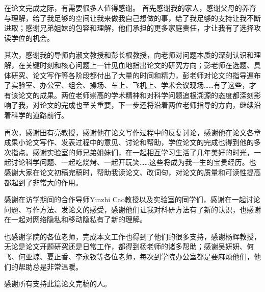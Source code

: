 \begin{thanks}
	
	在论文完成之际，有需要很多人值得感谢。
	首先感谢我的家人，感谢父母的养育与理解，给了我足够的空间让我来做我自己想做的事，给了我足够的支持让我不断进取；感谢兄弟姐妹的包容和理解，他们承担的更多家庭责任，才让我有了选择攻读学位的机会。
	
	其次，感谢我的导师向淑文教授和彭长根教授，向老师对问题本质的深刻认识和理解，在关键时刻和核心问题上一针见血地指出论文的研究方向；彭老师在选题、具体研究、论文写作等各阶段都付出了大量的时间和精力，彭老师对论文的指导遍布了实验室、办公室、组会、操场、车上、飞机上、学术会议现场……有了这些，才有该论文的成果。两位老师崇高的学术精神和对科学问题追根溯源的态度都深刻影响了我，对论文的完成也至关重要，下一步还将沿着两位老师指导的方向，继续沿着科学的道路前行。
	
	再次，感谢田有亮教授，感谢他在论文写作过程中的反复讨论，感谢他在论文各章成果小论文写作、发表过程中的意见、讨论和帮助，学位论文的完成也得到他的多次指点。感谢实验室的师兄弟姐妹们，在一起相互学习生活了几年美好的时光，一起讨论科学问题、一起吃烧烤、一起开玩笑……这些将成为我一生的宝贵经历。也感谢大家在论文初稿完稿时，帮助我读论文、改词句，对论文的质量和可读性提高都起到了非常大的作用。
	
	感谢在访学期间的合作导师Yinzhi Cao教授以及实验室的同学们，感谢在一起讨论问题、写作方法、发论文的感受，感谢他们让我对科研方法有了新的认识，也感谢在一起对网络隐私和移动隐私有了新的理解。
	
	也感谢学院的各位老师，完成本文工作也得到了他们的很多支持，感谢杨辉教授，无论是论文开题研究还是日常工作，都得到杨老师的诸多帮助；感谢吴妍妍、何飞、何亚琼、夏正香、李永钗等各位老师，每次到学院办公室都是要麻烦他们，他们的帮助总是非常温暖。
	
	感谢所有支持此篇论文完稿的人。
	
	
\end{thanks}